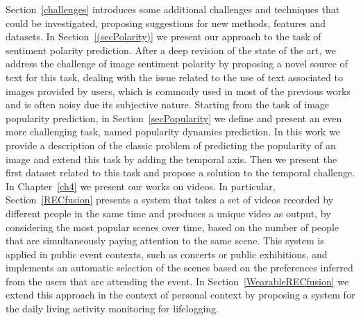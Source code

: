 Section~\ref{challenges} introduces some additional challenges and techniques that could be investigated, proposing suggestions for new methods, features and datasets.
In Section~\ref{(secPolarity)} we present our approach to the task of sentiment polarity prediction. After a deep revision of the state of the art, we address the challenge of image sentiment polarity by proposing a novel source of text for this task, dealing with the issue related to the use of text associated to images provided by users, which is commonly used in most of the previous works and is often noisy due its subjective nature.
Starting from the task of image popularity prediction, in Section~\ref{secPopularity} we define and present an even more challenging task, named popularity dynamics prediction. In this work we provide a description of the classic problem of predicting the popularity of an image and extend this task by adding the temporal axis. 
Then we present the first dataset related to this task and propose a solution to the temporal challenge.
In Chapter~\ref{ch4} we present our works on videos. In particular, Section~\ref{RECfusion} presents a system that takes a set of videos recorded by different people in the same time and produces a unique video as output, by considering the most popular scenes over time, based on the number of people that are simultaneously paying attention to the same scene. This system is applied in public event contexts, such as concerts or public exhibitions, and implements an automatic selection of the scenes based on the preferences inferred from the users that are attending the event.
In Section~\ref{WearableRECfusion} we extend this approach in the context of personal context by proposing a system for the daily living activity monitoring for lifelogging.


